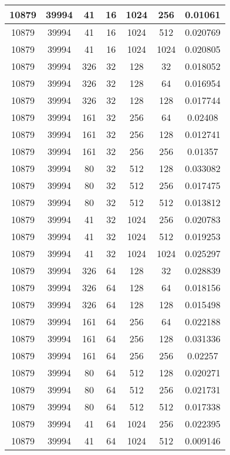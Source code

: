 \documentclass[9pt]{article}
\begin{document}
\begin{tabular}{|c|c|c|c|c|c|c| }
\hline
10879  & 39994  & 41  & 16  & 1024  & 256  & 0.01061 \\
\hline
10879  & 39994  & 41  & 16  & 1024  & 512  & 0.020769 \\
\hline
10879  & 39994  & 41  & 16  & 1024  & 1024  & 0.020805 \\
\hline
10879  & 39994  & 326  & 32  & 128  & 32  & 0.018052 \\
\hline
10879  & 39994  & 326  & 32  & 128  & 64  & 0.016954 \\
\hline
10879  & 39994  & 326  & 32  & 128  & 128  & 0.017744 \\
\hline
10879  & 39994  & 161  & 32  & 256  & 64  & 0.02408 \\
\hline
10879  & 39994  & 161  & 32  & 256  & 128  & 0.012741 \\
\hline
10879  & 39994  & 161  & 32  & 256  & 256  & 0.01357 \\
\hline
10879  & 39994  & 80  & 32  & 512  & 128  & 0.033082 \\
\hline
10879  & 39994  & 80  & 32  & 512  & 256  & 0.017475 \\
\hline
10879  & 39994  & 80  & 32  & 512  & 512  & 0.013812 \\
\hline
10879  & 39994  & 41  & 32  & 1024  & 256  & 0.020783 \\
\hline
10879  & 39994  & 41  & 32  & 1024  & 512  & 0.019253 \\
\hline
10879  & 39994  & 41  & 32  & 1024  & 1024  & 0.025297 \\
\hline
10879  & 39994  & 326  & 64  & 128  & 32  & 0.028839 \\
\hline
10879  & 39994  & 326  & 64  & 128  & 64  & 0.018156 \\
\hline
10879  & 39994  & 326  & 64  & 128  & 128  & 0.015498 \\
\hline
10879  & 39994  & 161  & 64  & 256  & 64  & 0.022188 \\
\hline
10879  & 39994  & 161  & 64  & 256  & 128  & 0.031336 \\
\hline
10879  & 39994  & 161  & 64  & 256  & 256  & 0.02257 \\
\hline
10879  & 39994  & 80  & 64  & 512  & 128  & 0.020271 \\
\hline
10879  & 39994  & 80  & 64  & 512  & 256  & 0.021731 \\
\hline
10879  & 39994  & 80  & 64  & 512  & 512  & 0.017338 \\
\hline
10879  & 39994  & 41  & 64  & 1024  & 256  & 0.022395 \\
\hline
10879  & 39994  & 41  & 64  & 1024  & 512  & 0.009146 \\

\end{tabular}
\end{document}
